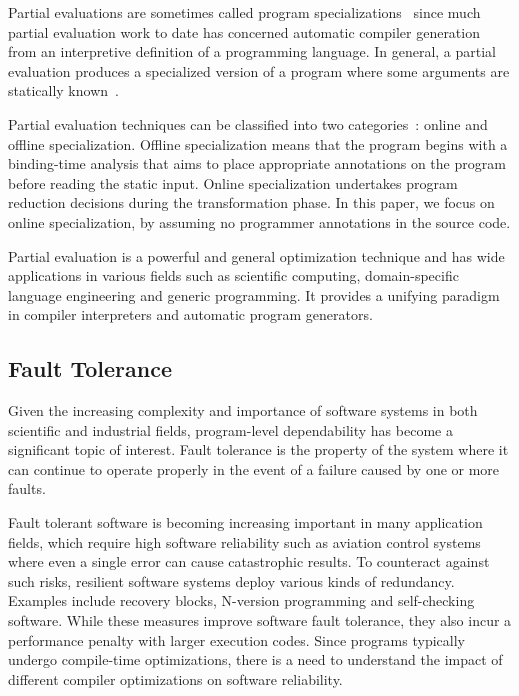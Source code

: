 \bigbreak

Partial evaluations are sometimes called program specializations~\cite{Futamura} since much partial evaluation work to date has concerned automatic compiler generation from an interpretive definition of a programming language.
In general, a partial evaluation produces a specialized version of a program where some arguments are statically known~\cite{Jones1996}. 

Partial evaluation techniques can be classified into two categories~\cite{Christensen}: online and offline specialization.
Offline specialization means that the program begins with a binding-time analysis that aims to place appropriate annotations on the program before reading the static input.
Online specialization undertakes program reduction decisions during the transformation phase.
In this paper, we focus on online specialization, by assuming no programmer annotations in the source code.

Partial evaluation is a powerful and general optimization technique and has wide applications in various fields such as scientific computing, domain-specific language engineering and generic programming.
It provides a unifying paradigm in compiler interpreters and automatic program generators.

\subsection{Fault Tolerance}
\label{sec:fault_tolerance}
Given the increasing complexity and importance of software systems in both scientific and industrial fields, program-level dependability has become a significant topic of interest.
Fault tolerance is the property of the system where it can continue to operate properly in the event of a failure caused by one or more faults.

Fault tolerant software is becoming increasing important in many application fields, which require high software reliability such as aviation control systems where even a single error can cause catastrophic results.
To counteract against such risks, resilient software systems deploy various kinds of redundancy.
Examples include recovery blocks, N-version programming and self-checking software.
While these measures improve software fault tolerance, they also incur a performance penalty with larger execution codes.
Since programs typically undergo compile-time optimizations, there is a need to understand the impact of different compiler optimizations on software reliability.

